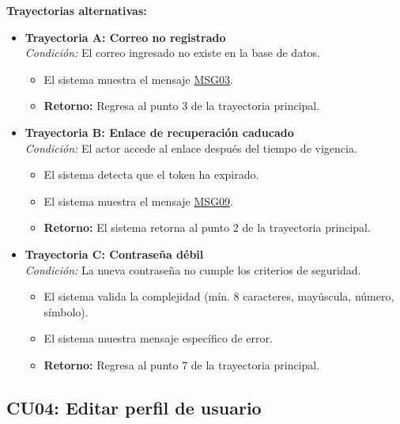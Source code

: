 \begin{appendices}
\textbf{Trayectorias alternativas:}
\begin{itemize}[leftmargin=*]
    \item \textbf{Trayectoria A: Correo no registrado} \\
    \textit{Condición:} El correo ingresado no existe en la base de datos.
    \begin{itemize}[nosep]
        \item[A-1:] El sistema muestra el mensaje \hyperlink{msg:MSG03}{MSG03}.
        \item \textbf{Retorno:} Regresa al punto 3 de la trayectoria principal.
    \end{itemize}
    \item \textbf{Trayectoria B: Enlace de recuperación caducado} \\
    \textit{Condición:} El actor accede al enlace después del tiempo de vigencia.
    \begin{itemize}[nosep]
        \item[B-1:] El sistema detecta que el token ha expirado.
        \item[B-2:] El sistema muestra el mensaje \hyperlink{msg:MSG09}{MSG09}.
        \item \textbf{Retorno:} El sistema retorna al punto 2 de la trayectoria principal.
    \end{itemize}
    \item \textbf{Trayectoria C: Contraseña débil} \\
    \textit{Condición:} La nueva contraseña no cumple los criterios de seguridad.
    \begin{itemize}[nosep]
        \item[C-1:] El sistema valida la complejidad (mín. 8 caracteres, mayúscula, número, símbolo).
        \item[C-2:] El sistema muestra mensaje específico de error.
        \item \textbf{Retorno:} Regresa al punto 7 de la trayectoria principal.
    \end{itemize}
\end{itemize}

\newpage

\subsection{CU04: Editar perfil de usuario}


\end{appendices}
